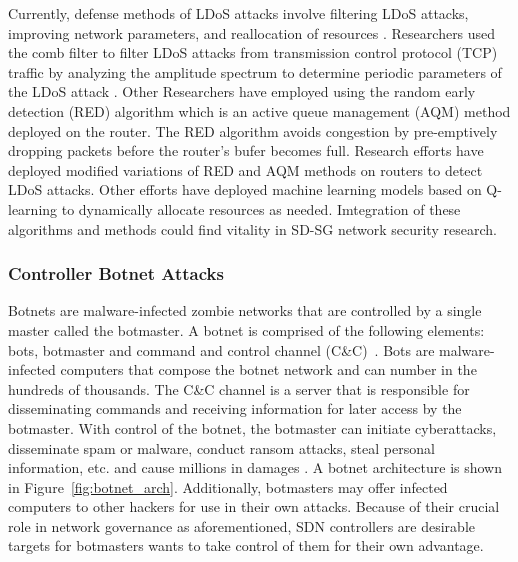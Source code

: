 \documentclass[conference]{IEEEtran}
\begin{document}
    Currently, defense methods of LDoS attacks involve filtering LDoS attacks, improving network parameters, and reallocation of resources \cite{zhijun2020low}. Researchers used the comb filter to filter LDoS attacks from transmission control protocol (TCP) traffic by analyzing the amplitude spectrum to determine periodic parameters of the LDoS attack \cite{wu2017low}. Other Researchers have employed using the random early detection (RED) algorithm which is an active queue management (AQM) method deployed on the router. The RED algorithm avoids congestion by pre-emptively dropping packets before the router's bufer becomes full. Research efforts \cite{zhang2010rred, kuzmanovic2003low} have deployed modified variations of RED and AQM methods on routers to detect LDoS attacks. Other efforts \cite{liu2011q} have deployed machine learning models based on Q-learning to dynamically allocate resources as needed. Imtegration of these algorithms and methods could find vitality in SD-SG network security research.

    
    
    \subsubsection{Controller Botnet Attacks} Botnets are malware-infected zombie networks that are controlled by a single master called the botmaster. A botnet is comprised of the following elements: bots, botmaster and command and control channel (C\&C)~\cite{shinan2021machine}. Bots are malware-infected computers  that compose the botnet network and can number in the hundreds of thousands. The C\&C channel is a server that is responsible for disseminating commands and receiving information for later access by the botmaster.  With control of the botnet, the botmaster can initiate cyberattacks, disseminate spam or malware, conduct ransom attacks, steal personal information, etc. and cause millions in damages \cite{shinan2021machine}. A botnet architecture is shown in Figure~\ref{fig:botnet_arch}. Additionally, botmasters may offer infected computers to other hackers for use in their own attacks. Because of their crucial role in network governance as aforementioned, SDN controllers are desirable targets for botmasters wants to take control of them for their own advantage. 
    
\end{document}
